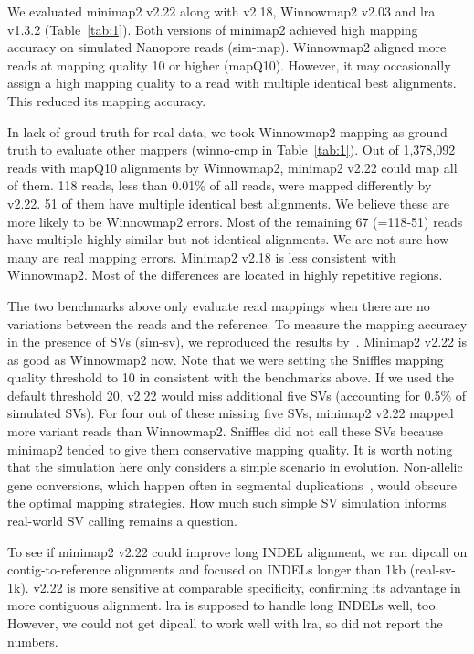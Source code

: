\documentclass{bioinfo}
\begin{document}
We evaluated minimap2 v2.22 along with v2.18, Winnowmap2 v2.03 and lra v1.3.2
(Table~\ref{tab:1}). Both versions of minimap2 achieved high mapping accuracy on
simulated Nanopore reads (sim-map). Winnowmap2 aligned more reads at mapping
quality 10 or higher (mapQ10). However, it may occasionally assign a high mapping
quality to a read with multiple identical best alignments. This reduced its
mapping accuracy.

In lack of groud truth for real data, we took Winnowmap2 mapping as ground
truth to evaluate other mappers (winno-cmp in Table~\ref{tab:1}). Out of 1,378,092 reads with mapQ10
alignments by Winnowmap2, minimap2 v2.22 could map all of them. 118 reads, less
than 0.01\% of all reads, were mapped differently by v2.22. 51 of them have
multiple identical best alignments. We believe these are more likely to be
Winnowmap2 errors. Most of the remaining 67 (=118-51) reads have multiple
highly similar but not identical alignments. We are not sure how many are real
mapping errors. Minimap2 v2.18 is less consistent with Winnowmap2. Most of the
differences are located in highly repetitive regions.

The two benchmarks above only evaluate read mappings when there are no variations between the reads and the reference.
To measure the mapping accuracy in the presence of SVs (sim-sv), we reproduced
the results by~\citep{Jain2020.11.01.363887}. Minimap2 v2.22 is as good as
Winnowmap2 now. Note that we were setting the Sniffles mapping quality
threshold to 10 in consistent with the benchmarks above. If we used the
default threshold 20, v2.22 would miss additional five SVs (accounting for
0.5\% of simulated SVs). For four out of these missing five SVs, minimap2 v2.22
mapped more variant reads than Winnowmap2. Sniffles did not call these SVs
because minimap2 tended to give them conservative mapping quality. It is worth
noting that the simulation here only considers a simple scenario in evolution.
Non-allelic gene conversions, which happen often in segmental
duplications~\citep{Harpak:2017aa}, would obscure the optimal mapping
strategies. How much such simple SV simulation informs real-world SV calling
remains a question.

To see if minimap2 v2.22 could improve long INDEL alignment, we ran dipcall on
contig-to-reference alignments and focused on INDELs longer than 1kb
(real-sv-1k). v2.22 is more sensitive at comparable specificity, confirming its
advantage in more contiguous alignment. lra is supposed to handle long INDELs
well, too. However, we could not get dipcall to work well with lra,
so did not report the numbers.
\end{document}
